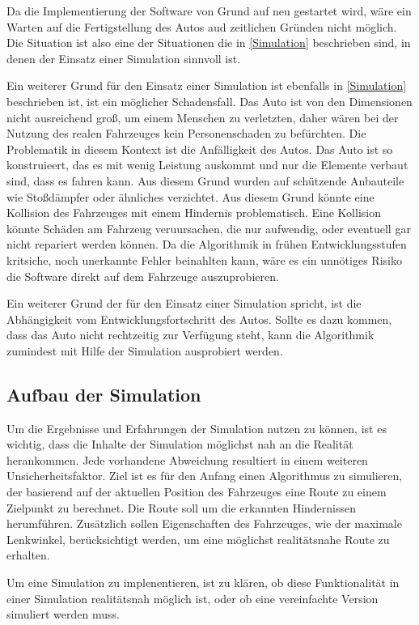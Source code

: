 Da die Implementierung der Software von Grund auf neu gestartet wird, 
wäre ein Warten auf die Fertigstellung des Autos aud zeitlichen Gründen nicht möglich.
Die Situation ist also eine der Situationen die in \ref{Simulation} beschrieben sind, 
in denen der Einsatz einer Simulation sinnvoll ist.

Ein weiterer Grund für den Einsatz einer Simulation ist ebenfalls in \ref{Simulation} beschrieben ist, 
ist ein möglicher Schadensfall. Das Auto ist von den Dimensionen nicht ausreichend groß, 
um einem Menschen zu verletzten, daher wären bei der Nutzung des realen Fahrzeuges kein Personenschaden zu befürchten.
Die Problematik in diesem Kontext ist die Anfälligkeit des Autos. 
Das Auto ist so konstruieert, das es mit wenig Leistung auskommt und nur die Elemente verbaut sind, 
dass es fahren kann. Aus diesem Grund wurden auf schützende Anbauteile wie Stoßdämpfer oder ähnliches verzichtet.
Aus diesem Grund könnte eine Kollision des Fahrzeuges mit einem Hindernis problematisch. 
Eine Kollision könnte Schäden am Fahrzeug veruursachen, die nur aufwendig, oder eventuell gar nicht repariert werden können.
Da die Algorithmik in frühen Entwicklungsstufen kritsiche, noch unerkannte Fehler beinahlten kann,
wäre es ein unnötiges Risiko die Software direkt auf dem Fahrzeuge auszuprobieren.

Ein weiterer Grund der für den Einsatz einer Simulation spricht, ist die Abhängigkeit vom Entwicklungsfortschritt 
des Autos. Sollte es dazu kommen, dass das Auto nicht rechtzeitig zur Verfügung steht, 
kann die Algorithmik zumindest mit Hilfe der Simulation ausprobiert werden.

\subsection{Aufbau der Simulation}
Um die Ergebnisse und Erfahrungen der Simulation nutzen zu können, ist es wichtig, dass die Inhalte der Simulation
möglichst nah an die Realität herankommen.
Jede vorhandene Abweichung resultiert in einem weiteren Unsicherheitsfaktor. 
Ziel ist es für den Anfang einen Algorithmus zu simulieren, der basierend auf der aktuellen Position des Fahrzeuges eine Route zu einem Zielpunkt zu berechnet.
Die Route soll um die erkannten Hindernissen herumführen.
Zusätzlich sollen Eigenschaften des Fahrzeuges, wie der maximale Lenkwinkel, berücksichtigt werden, um eine möglichst realitätsnahe Route zu erhalten.   

Um eine Simulation zu implenentieren, ist zu klären, ob diese Funktionalität in einer Simulation realitätsnah möglich ist,
 oder ob eine vereinfachte Version simuliert werden muss.

